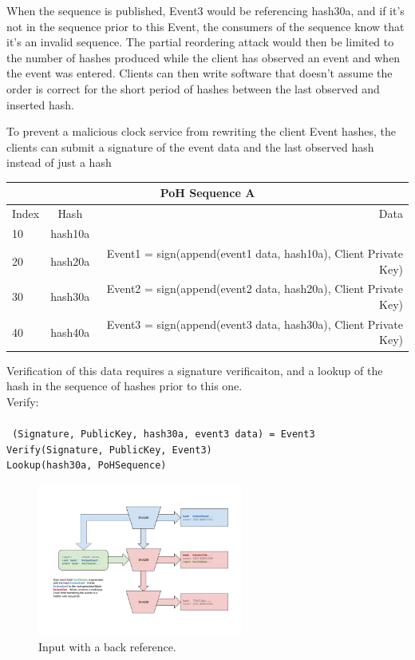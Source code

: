 \documentclass[12pt]{article}
\begin{document}
When the sequence is published, Event3 would be referencing hash30a, and if it’s not in the sequence prior to this Event, the consumers of the sequence know that it’s an invalid sequence. The partial reordering attack would then be limited to the number of hashes produced while the client has observed an event and when the event was entered. Clients can then write software that doesn’t assume the order is correct for the short period of hashes between the last observed and inserted hash.

To prevent a malicious clock service from rewriting the client Event hashes, the clients can submit a signature of the event data and the last observed hash instead of just a hash\\
\begin{center}
  \begin{tabular}{ | l | c | r |}
    \hline
    \multicolumn{3}{|c|}{PoH Sequence A} \\
    \hline
    Index & Hash & Data \\ \hline
    10 & hash10a & \\ \hline
    20 & hash20a & Event1 = sign(append(event1 data, hash10a), Client Private Key) \\ \hline
    30 & hash30a & Event2 = sign(append(event2 data, hash20a), Client Private Key) \\ \hline
    40 & hash40a & Event3 = sign(append(event3 data, hash30a), Client Private Key) \\
    \hline
    \end{tabular}
\end{center}

Verification of this data requires a signature verificaiton, and a lookup of the hash in the sequence of hashes prior to this one.\\
\noindent Verify:\\\\\noindent
\texttt{
    (Signature, PublicKey, hash30a, event3 data) = Event3 \\
    Verify(Signature, PublicKey, Event3)\\
    Lookup(hash30a, PoHSequence)
}

\begin{figure}
  \begin{center}
    \centering
    \includegraphics[width=0.6\textwidth]{figures/fig_6.png}
    \caption[Fig 6]{Input with a back reference.\label{fig:poh_consistency}}
  \end{center}
  \end{figure}
\end{document}
